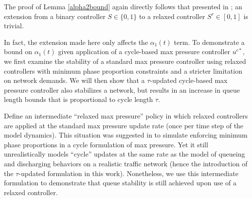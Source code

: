 The proof of Lemma \ref{alpha2bound} again directly follows that presented in \cite{Varaiya2013}; an extension from a binary controller $S\in \{0,1\}$ to a relaxed controller $S^r\in [0,1]$ is trivial. 

In fact, the extension made here only affects the $\alpha_1 (t)$ term. To demonstrate a bound on $\alpha_1(t)$ given application of a cycle-based max pressure controller $u^{c*}$, we first examine the stability of a standard max pressure controller using relaxed controllers with minimum phase proportion constraints and a stricter limitation on network demands. We will then show that a $\tau$-updated cycle-based max pressure controller also stabilizes a network, but results in an increase in queue length bounds that is proportional to cycle length $\tau$. 

Define an intermediate ``relaxed max pressure'' policy in which relaxed controllers are applied at the standard max pressure update rate (once per time step of the model dynamics). 
This situation was suggested in \cite{Varaiya2013} to simulate enforcing minimum phase proportions in a cycle formulation of max pressure. Yet it still unrealistically models ``cycle'' updates at the same rate as the model of queueing and discharging behaviors on a realistic traffic network (hence the introduction of the $\tau$-updated formulation in this work). Nonetheless, we use this intermediate formulation to demonstrate that queue stability is still achieved upon use of a relaxed controller. 

